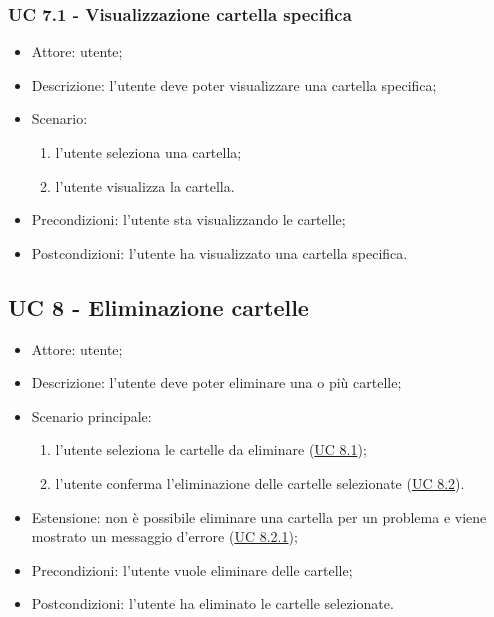     \subsubsection{UC 7.1 - Visualizzazione cartella specifica} \label{sec: UC 7.1}
    \begin{itemize}
        \item Attore: utente;
        \item Descrizione: l'utente deve poter visualizzare una cartella specifica;
        \item Scenario:
        \begin{enumerate}
        \item l'utente seleziona una cartella;
        \item l'utente visualizza la cartella.
        \end{enumerate}
        \item Precondizioni: l'utente sta visualizzando le cartelle;
        \item Postcondizioni: l'utente ha visualizzato una cartella specifica.
    \end{itemize}

    \subsection{UC 8 - Eliminazione cartelle}
    \begin{itemize}
        \item Attore: utente;
        \item Descrizione: l'utente deve poter eliminare una o più cartelle;
        \item Scenario principale:
            \begin{enumerate}
            \item l'utente seleziona le cartelle da eliminare (\hyperref[sec: UC 8.1]{UC 8.1});
            \item l'utente conferma l'eliminazione delle cartelle selezionate (\hyperref[sec: UC 8.2]{UC 8.2}).
            \end{enumerate}
        \item Estensione: non è possibile eliminare una cartella per un problema e viene mostrato un messaggio d'errore (\hyperref[sec: UC 8.2.1]{UC 8.2.1});
        \item Precondizioni: l'utente vuole eliminare delle cartelle;
        \item Postcondizioni: l'utente ha eliminato le cartelle selezionate.
    \end{itemize}
